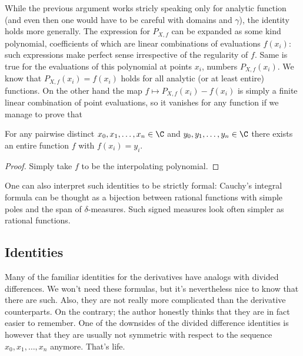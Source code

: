 While the previous argument works stricly speaking only for analytic function (and even then one would have to be careful with domains and $\gamma$), the identity holds more generally. The expression for $P_{X, f}$ can be expanded as some kind polynomial, coefficients of which are linear combinations of evaluations $f(x_{i})$: such expressions make perfect sense irrespective of the regularity of $f$. Same is true for the evaluations of this polynomial at points $x_{i}$, numbers $P_{X, f}(x_{i})$. We know that $P_{X, f}(x_{i}) = f(x_{i})$ holds for all analytic (or at least entire) functions. On the other hand the map $f \mapsto P_{X, f}(x_{i}) - f(x_{i})$ is simply a finite linear combination of point evaluations, so it vanishes for any function if we manage to prove that

\begin{lem}\label{entire_interpolation}
	For any pairwise distinct $x_{0}, x_{1}, \ldots, x_{n} \in \C$ and $y_{0}, y_{1}, \ldots, y_{n} \in \C$ there exists an entire function $f$ with $f(x_{i}) = y_{i}$.
\end{lem}
\begin{proof}
	Simply take $f$ to be the interpolating polynomial.
\end{proof}

One can also interpret such identities to be strictly formal: Cauchy's integral formula can be thought as a bijection between rational functions with simple poles and the span of $\delta$-measures. Such signed measures look often simpler as rational functions.

\subsection{Identities}

Many of the familiar identities for the derivatives have analogs with divided differences. We won't need these formulas, but it's nevertheless nice to know that there are such. Also, they are not really more complicated than the derivative counterparts. On the contrary; the author honestly thinks that they are in fact easier to remember. One of the downsides of the divided difference identities is however that they are usually not symmetric with respect to the sequence $x_{0}, x_{1}, \ldots, x_{n}$ anymore. That's life.

